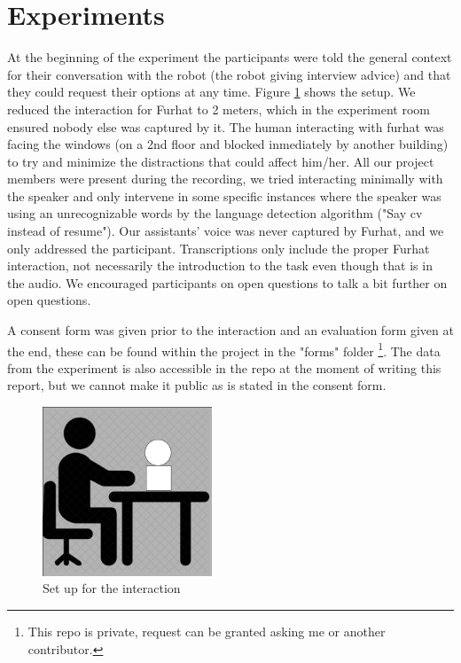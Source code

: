 \documentclass[11pt]{article}
\begin{document}
\section{Experiments}

At the beginning of the experiment the participants were told the general context for their conversation with the robot (the robot giving interview advice) and that they could request their options at any time. Figure \ref{set_up} shows the setup. We reduced the interaction for Furhat to 2 meters, which in the experiment room ensured nobody else was captured by it. The human interacting with furhat was facing the windows (on a 2nd floor and blocked inmediately by another building) to try and minimize the distractions that could affect him/her. All our project members were present during the recording, we tried interacting minimally with the speaker and only intervene in some specific instances where the speaker was using an unrecognizable words by the language detection algorithm ("Say cv instead of resume"). Our assistants' voice was never captured by Furhat, and we only addressed the participant. Transcriptions only include the proper Furhat interaction, not necessarily the introduction to the task even though that is in the audio. We encouraged participants on open questions to talk a bit further on open questions.


A consent form was given prior to the interaction and an evaluation form given at the end, these can be found within the project in the "forms" folder \cite{xarxaxdev-FurhatInterviewRobot} \footnote{This repo is private, request can be granted asking me or another contributor.}. The data from the experiment is also accessible in the repo at the moment of writing this report, but we cannot make it public as is stated in the consent form.

\begin{figure}[h]
	
	\centering
	\includegraphics[width=0.45\textwidth]{set_up}
	\caption{Set up for the interaction}
	\label{set_up}
\end{figure}
\end{document}
